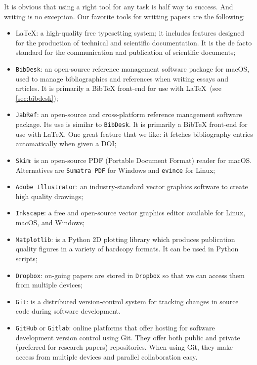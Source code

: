 \documentclass[authoryear,3p,times,preprint,review,fleqn]{elsarticle}
\numberwithin{equation}{section}
\theoremstyle{remark}
\begin{document}
It is obvious that using a right tool for any task is half way to success. And writing is no exception. Our favorite tools for writting papers are the following:

\begin{itemize}
\item \LaTeX:  a high-quality free typesetting system; it includes features designed for the production of technical and scientific documentation. It is the de facto standard for the communication and publication of scientific documents; 
\item \texttt{BibDesk}: an open-source reference management software package for macOS, used to manage bibliographies and references when writing essays and articles. It is primarily a BibTeX front-end for use with \LaTeX\ (see \cref{sec:bibdesk});
\item \texttt{JabRef}:  an open-source and cross-platform reference management software package. Its use is similar to \texttt{BibDesk}. It is primarily a BibTeX front-end for use with \LaTeX. One great feature that we like: it fetches bibliography entries automatically when given a DOI;
\item \texttt{Skim}: is an open-source PDF (Portable Document Format) reader for macOS. Alternatives are \texttt{Sumatra PDF} for Windows and \texttt{evince} for Linux;
\item \texttt{Adobe Illustrator}: an industry-standard vector graphics software to create high quality drawings;
\item \texttt{Inkscape}: a free and open-source vector graphics editor available for Linux, macOS, and Windows;
\item \texttt{Matplotlib}: is a Python 2D plotting library which produces publication quality figures in a variety of hardcopy formats. It can be used in Python scripts;
\item \texttt{Dropbox}: on-going papers are stored in \texttt{Dropbox} so that we can access them from multiple devices;
\item \texttt{Git}: is a distributed version-control system for tracking changes in source code during software development.
\item \texttt{GitHub} or \texttt{Gitlab}: online platforms that offer hosting for software development version control using Git. They offer both public and private (preferred for research papers) repositories. When using Git, they make access from multiple devices and parallel collaboration easy.
\end{itemize}
\end{document}
